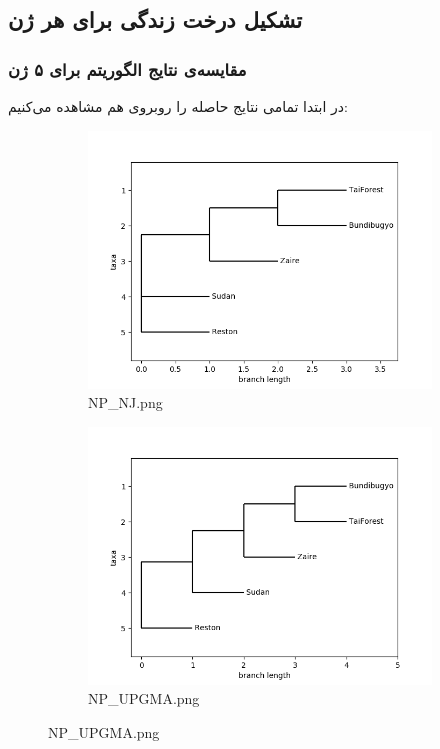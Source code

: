 \documentclass[11pt]{article}
\begin{document}
\subsection{تشکیل درخت زندگی برای هر ژن}
\subsubsection{مقایسه‌ی نتایج الگوریتم برای ۵ ژن}
در ابتدا تمامی نتایج حاصله را روبروی هم مشاهده می‌کنیم:
\begin{figure}[h]
  \centering
  \begin{subfigure}[b]{0.4\linewidth}
    \includegraphics[width=\linewidth]{../Data/Trees/NP_NJ.png}
    \caption{NP\_NJ.png}
  \end{subfigure}
  \begin{subfigure}[b]{0.4\linewidth}
    \includegraphics[width=\linewidth]{../Data/Trees/NP_UPGMA.png}
    \caption{NP\_UPGMA.png}
  \end{subfigure}
\end{figure}
\end{document}
